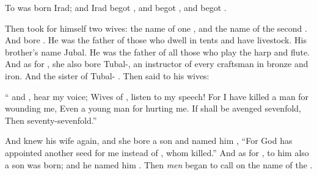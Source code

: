 \bverse To  was born Irad; and Irad begot , and  begot , and  begot .

\bverse Then  took for himself two wives: the name of one \was {}, and the name of the second \was {}.
\bverse And  bore . He was the father of those who dwell in tents and have livestock.
\bverse His brother's name \was Jubal. He was the father of all those who play the harp and flute.
\bverse And as for , she also bore Tubal-, an instructor of every craftsman in bronze and iron. And the sister of Tubal- \was {}.
\bverse Then  said to his wives:
\begin{bquotation}
`` and , hear my voice; Wives of , listen to my speech! For I have killed a man for wounding me, Even a young man for hurting me. \bverse If  shall be avenged sevenfold, Then  seventy-sevenfold.''
\end{bquotation}


\bverse And  knew his wife again, and she bore a son and named him , ``For God has appointed another seed for me instead of , whom  killed.''
\bverse And as for , to him also a son was born; and he named him . Then \textit{men} began to call on the name of the \lord.
